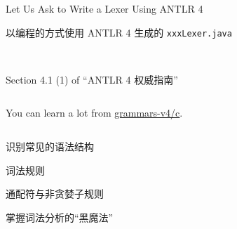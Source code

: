 \begin{frame}{}
  \begin{center}
    {\large Let Us Ask  to Write a Lexer Using ANTLR 4}
  \end{center}
\end{frame}

\begin{frame}{}
  \begin{center}
    以编程的方式使用 ANTLR 4 生成的 \texttt{xxxLexer.java}
  \end{center}

  \begin{columns}
  \end{columns}
\end{frame}

\begin{frame}{}
  \begin{center}
     \\[10pt]

    Section 4.1 (1) of ``ANTLR 4 权威指南''
  \end{center}

  \begin{columns}
  \end{columns}
\end{frame}

\begin{frame}{}
  \begin{center}
    You can learn a lot from \href{https://github.com/antlr/grammars-v4/tree/master/c}{grammars-v4/c}.
  \end{center}
\end{frame}

\begin{frame}{}
  \begin{columns}
      \begin{description}
        \setlength{\itemsep}{8pt}
        \item[5.5:] 识别常见的语法结构
        \item[15.5:] 词法规则
        \item[15.6:] 通配符与非贪婪子规则
        \item[\red{12:}] 掌握词法分析的``黑魔法''
      \end{description}
  \end{columns}
\end{frame}
